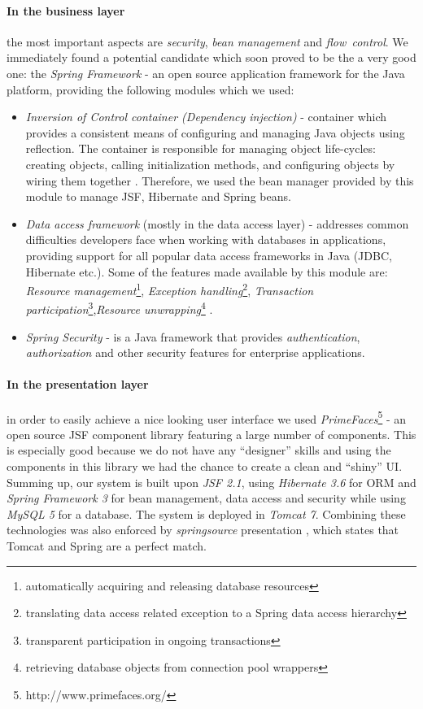 \paragraph{In the business layer} the most important aspects are
\emph{security}, \emph{bean management} and \emph{flow~control}. We
immediately found a potential candidate which soon proved to be the a very good
one: the \emph{Spring Framework} - an open source application framework for the
Java platform, providing the following modules which we used:
\begin{itemize}
  \item \emph{Inversion of Control container (Dependency injection)} -
  container which provides a consistent means of configuring and managing Java
  objects using reflection. The container is responsible for managing
  object life-cycles: creating objects, calling initialization methods, and
  configuring objects by wiring them together \cite{wiki_spring}. Therefore, we
  used the bean manager provided by this module to manage JSF, Hibernate and
  Spring beans.
  \item \emph{Data access framework} (mostly in the data access layer) -
  addresses common difficulties developers face when working with databases in applications, providing support for all
  popular data access frameworks in Java (JDBC, Hibernate etc.). Some of the
  features made available by this module are: \emph{Resource
  management}\footnote{automatically acquiring and releasing database
  resources}, \emph{Exception handling}\footnote{translating data access related
  exception to a Spring data access hierarchy}, \emph{Transaction
  participation}\footnote{transparent participation in ongoing
  transactions},\emph{Resource unwrapping}\footnote{retrieving database objects
  from connection pool wrappers} \cite{wiki_spring}.
  \item \emph{Spring Security} - is a Java framework that provides
  \emph{authentication}, \emph{authorization} and other security features for
  enterprise applications.
\end{itemize}

\paragraph{In the presentation layer} in order to easily achieve a nice looking
user interface we used \emph{PrimeFaces}\footnote{http://www.primefaces.org/} - an open source
JSF component library featuring a large number of components. This is especially
good because we do not have any ``designer'' skills and using the components in
this library we had the chance to create a clean and ``shiny'' UI.\\

\noindent Summing up, our system is built upon \emph{JSF 2.1}, using
\emph{Hibernate 3.6} for ORM and \emph{Spring Framework 3} for bean management, data access and
security while using \emph{MySQL 5} for a database. The system is deployed in
\emph{Tomcat 7}. Combining these technologies was also enforced by
\emph{springsource} presentation \cite{tomcat_spring}, which states that Tomcat
and Spring are a perfect match.
